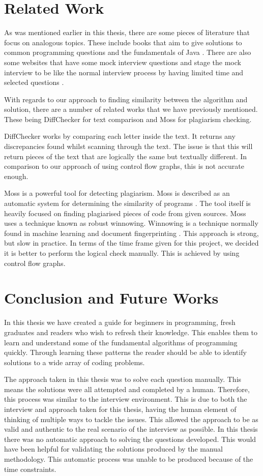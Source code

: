\documentclass[conference]{IEEEtran}
\begin{document}
\section{Related Work}
As was mentioned earlier in this thesis, there are some pieces of literature that focus on analogous topics. These include books that aim to give solutions to common programming questions \cite{mcdowell2015cracking} and the fundamentals of Java \cite{markham2014java}\cite{aziz2012elements}. There are also some websites that have some mock interview questions and stage the mock interview to be like the normal interview process by having limited time and selected questions \cite{pramp}.
\par With regards to our approach to finding similarity between the algorithm and solution, there are a number of related works that we have previously mentioned. These being DiffChecker for text comparison and Moss for plagiarism checking. 
\par DiffChecker works by comparing each letter inside the text. It returns any discrepancies found whilst scanning through the text. The issue is that this will return pieces of the text that are logically the same but textually different. In comparison to our approach of using control flow graphs, this is not accurate enough. 
\par Moss is a powerful tool for detecting plagiarism. Moss is described as an automatic system for determining the similarity of programs \cite{mosswebsite}. The tool itself is heavily focused on finding plagiarised pieces of code from given sources. Moss uses a technique known as robust winnowing. Winnowing is a technique normally found in machine learning and document fingerprinting \cite{Schleimer:2003:WLA:872757.872770}. This approach is strong, but slow in practice. In terms of the time frame given for this project, we decided it is better to perform the logical check manually. This is achieved by using control flow graphs.

\section{Conclusion and Future Works}
In this thesis we have created a guide for beginners in programming, fresh graduates and readers who wish to refresh their knowledge. This enables them to learn and understand some of the fundamental algorithms of programming quickly. Through learning these patterns the reader should be able to identify solutions to a wide array of coding problems. 
\par The approach taken in this thesis was to solve each question manually. This means the solutions were all attempted and completed by a human. Therefore, this process was similar to the interview environment. This is due to both the interview and approach taken for this thesis, having the human element of thinking of multiple ways to tackle the issues. This allowed the approach to be as valid and authentic to the real scenario of the interview as possible.
In this thesis there was no automatic approach to solving the questions developed. This would have been helpful for validating the solutions produced by the manual methodology. This automatic process was unable to be produced because of the time constraints. 
\end{document}
